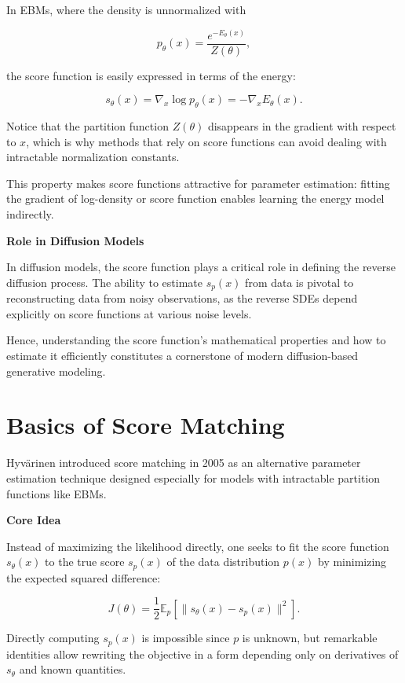 In EBMs, where the density is unnormalized with

\[
p_\theta(x) = \frac{e^{-E_\theta(x)}}{Z(\theta)},
\]

the score function is easily expressed in terms of the energy:

\[
s_\theta(x) = \nabla_x \log p_\theta(x) = -\nabla_x E_\theta(x).
\]

Notice that the partition function \( Z(\theta) \) disappears in the gradient with respect to \( x \), which is why methods that rely on score functions can avoid dealing with intractable normalization constants.

This property makes score functions attractive for parameter estimation: fitting the gradient of log-density or score function enables learning the energy model indirectly.

\textbf{Role in Diffusion Models}

In diffusion models, the score function plays a critical role in defining the reverse diffusion process. The ability to estimate \( s_p(x) \) from data is pivotal to reconstructing data from noisy observations, as the reverse SDEs depend explicitly on score functions at various noise levels.

Hence, understanding the score function's mathematical properties and how to estimate it efficiently constitutes a cornerstone of modern diffusion-based generative modeling.

\section{Basics of Score Matching}

Hyvärinen introduced score matching in 2005 as an alternative parameter estimation technique designed especially for models with intractable partition functions like EBMs.

\textbf{Core Idea}

Instead of maximizing the likelihood directly, one seeks to fit the score function \( s_\theta(x) \) to the true score \( s_p(x) \) of the data distribution \( p(x) \) by minimizing the expected squared difference:

\[
J(\theta) = \frac{1}{2} \mathbb{E}_{p} \left[ \| s_\theta(x) - s_p(x) \|^2 \right].
\]

Directly computing \( s_p(x) \) is impossible since \( p \) is unknown, but remarkable identities allow rewriting the objective in a form depending only on derivatives of \( s_\theta \) and known quantities.

